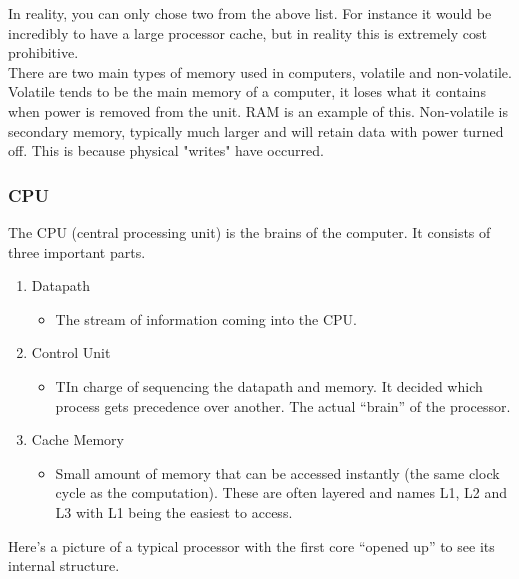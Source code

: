\documentclass[12pt, twoside, exarticle]{article}
\begin{document}
In reality, you can only chose two from the above list.  For instance it would be incredibly to have a large processor cache, but in reality this is extremely cost prohibitive. \\

There are two main types of memory used in computers, volatile and non-volatile. Volatile tends to be the main memory of a computer, it loses what it contains when power is removed from the unit.  RAM is an example of this.  Non-volatile is secondary memory, typically much larger and will retain data with power turned off.  This is because physical "writes" have occurred. \\

\subsubsection{CPU}

The CPU (central processing unit) is the brains of the computer.  It consists of three important parts.
\begin{enumerate}
\item Datapath
	\begin{itemize}
	\item The stream of information coming into the CPU.
	\end{itemize}
\item Control Unit
	\begin{itemize}
	\item TIn charge of sequencing the datapath and memory.  It decided which process gets precedence over another.  The actual ``brain'' of the processor.
	\end{itemize}
\item Cache Memory
	\begin{itemize}
	\item Small amount of memory that can be accessed instantly (the same clock cycle as the computation).  These are often layered and names L1, L2 and L3 with L1 being the easiest to access.
	\end{itemize}		
\end{enumerate}

Here's a picture of a typical processor with the first core ``opened up'' to see its internal structure. \\

\end{document}
